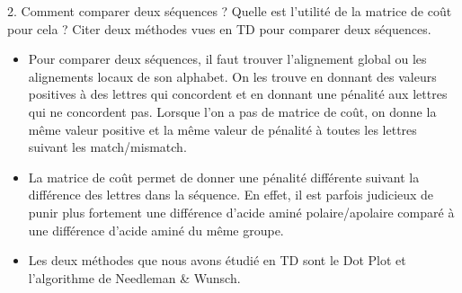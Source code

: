 \documentclass[
	12pt, %
]{fphw}
\begin{document}
\begin{problem}
	2. Comment comparer deux séquences ? Quelle est l'utilité de la matrice de coût pour cela ? Citer deux méthodes vues en TD pour comparer deux séquences.
\end{problem}
\begin{center}
	\begin{itemize}
		\item Pour comparer deux séquences, il faut trouver l'alignement global ou les alignements locaux de son alphabet. On les trouve en donnant des valeurs positives à des lettres qui concordent et en donnant une pénalité aux lettres qui ne concordent pas. Lorsque l'on a pas de matrice de coût, on donne la même valeur positive et la même valeur de pénalité à toutes les lettres suivant les match/mismatch.
		\item La matrice de coût permet de donner une pénalité différente suivant la différence des lettres dans la séquence. En effet, il est parfois judicieux de punir plus fortement une différence d'acide aminé polaire/apolaire comparé à une différence d'acide aminé du même groupe.
		\item Les deux méthodes que nous avons étudié en TD sont le Dot Plot et l'algorithme de Needleman \& Wunsch.
	\end{itemize}
\end{center}
\end{document}

